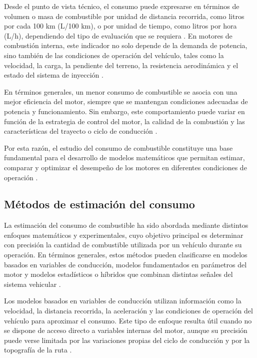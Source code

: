 Desde el punto de vista técnico, el consumo puede expresarse en términos de volumen o masa de combustible por unidad de distancia recorrida, como litros por cada 100 km (L/100 km), o por unidad de tiempo, como litros por hora (L/h), dependiendo del tipo de evaluación que se requiera \citep{PosadaHenao2016}. En motores de combustión interna, este indicador no solo depende de la demanda de potencia, sino también de las condiciones de operación del vehículo, tales como la velocidad, la carga, la pendiente del terreno, la resistencia aerodinámica y el estado del sistema de inyección \citep{ConsumoVehiculos2002, PosadaHenao2016}.

En términos generales, un menor consumo de combustible se asocia con una mejor eficiencia del motor, siempre que se mantengan condiciones adecuadas de potencia y funcionamiento. Sin embargo, este comportamiento puede variar en función de la estrategia de control del motor, la calidad de la combustión y las características del trayecto o ciclo de conducción \citep{EstimacionAlgoritmoUPS, ConsumoVehiculos2002}.

Por esta razón, el estudio del consumo de combustible constituye una base fundamental para el desarrollo de modelos matemáticos que permitan estimar, comparar y optimizar el desempeño de los motores en diferentes condiciones de operación \citep{PosadaHenao2016}.

\subsection{Métodos de estimación del consumo}

La estimación del consumo de combustible ha sido abordada mediante distintos enfoques matemáticos y experimentales, cuyo objetivo principal es determinar con precisión la cantidad de combustible utilizada por un vehículo durante su operación. En términos generales, estos métodos pueden clasificarse en modelos basados en variables de conducción, modelos fundamentados en parámetros del motor y modelos estadísticos o híbridos que combinan distintas señales del sistema vehicular \citep{EstimacionConsumoTransporte2004, EstimacionAlgoritmoUPS}.

Los modelos basados en variables de conducción utilizan información como la velocidad, la distancia recorrida, la aceleración y las condiciones de operación del vehículo para aproximar el consumo. Este tipo de enfoque resulta útil cuando no se dispone de acceso directo a variables internas del motor, aunque su precisión puede verse limitada por las variaciones propias del ciclo de conducción y por la topografía de la ruta \citep{ConsumoVehiculos2002, EstimacionConsumoTransporte2004}.

